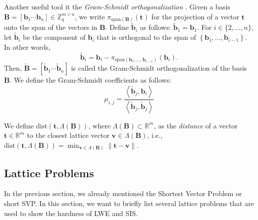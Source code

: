 Another useful tool it the \textit{Gram-Schmidt orthogonalization} \label{sec:gram-schmidt}. Given a basis $\mathbf{B} = \left[\mathbf{b}_1 \cdots \mathbf{b}_n\right] \in \mathbb{Z}_q^{m\times n}$, we write $\pi_{\text{span}(\mathbf{B})}(\mathbf{t})$ for the projection of a vector $\mathbf{t}$ onto the span of the vectors in $\mathbf{B}$.
Define $\tilde{\mathbf{b}}_i$ as follows: $\tilde{\mathbf{b}}_1 = \mathbf{b}_1$. For $i \in \{2, \ldots, n\}$, let $\tilde{\mathbf{b}}_i$ be the component of $\mathbf{b}_i$ that is orthogonal to the span of $\left\{\mathbf{b}_1, \ldots, \mathbf{b}_{i-1}\right\}$. In other words,
\begin{equation}
    \tilde{\mathbf{b}}_i = \mathbf{b}_i - \pi_{\text{span}(\mathbf{b}_1, \ldots, \mathbf{b}_{i-1})}(\mathbf{b}_i).
\end{equation} %
Then,  $\tilde{\mathbf{B}} = \left[\tilde{\mathbf{b}}_1 \cdots \tilde{\mathbf{b}}_n\right]$ is called the Gram-Schmidt orthogonalization of the basis $\mathbf{B}$. We define the Gram-Schmidt coefficients as follows:
\begin{equation}
    \mu_{i, j} = \frac{\left\langle \tilde{\mathbf{b}}_j, \mathbf{b}_i\right\rangle}{\left\langle \tilde{\mathbf{b}}_j, \tilde{\mathbf{b}}_j\right\rangle}
\end{equation}


We define $\text{dist}(\mathbf{t}, \Lambda(\mathbf{B}))$, where $\Lambda(\mathbf{B}) \subset \mathbb{R}^m$, as the \textit{distance} of a vector $\mathbf{t} \in \mathbb{R}^m$ to the closest lattice vector $\mathbf{v} \in \Lambda(\mathbf{B})$, i.e., $\text{dist}(\mathbf{t}, \Lambda(\mathbf{B})) = \min_{\mathbf{v} \in \Lambda(\mathbf{B})}\|\mathbf{t} -  \mathbf{v}\|$.






\subsection{Lattice Problems}\label{sec:lattice-problems}
In the previous section, we already mentioned the Shortest Vector Problem or short SVP. In this section, we want to briefly list several lattice problems that are used to show the hardness of LWE and SIS.

